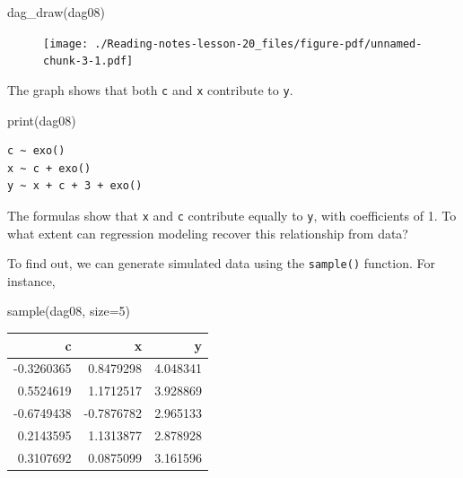 \documentclass[
  letterpaper,
  DIV=11,
  numbers=noendperiod,
  oneside]{scrreprt}
\newenvironment{Shaded}{\begin{snugshade}}{\end{snugshade}}
\newcommand{\AttributeTok}[1]{\textcolor[rgb]{0.40,0.45,0.13}{#1}}
\newcommand{\DecValTok}[1]{\textcolor[rgb]{0.68,0.00,0.00}{#1}}
\newcommand{\FunctionTok}[1]{\textcolor[rgb]{0.28,0.35,0.67}{#1}}
\newcommand{\NormalTok}[1]{\textcolor[rgb]{0.00,0.23,0.31}{#1}}
\begin{document}
\begin{Shaded}
\begin{Highlighting}[]
\FunctionTok{dag\_draw}\NormalTok{(dag08)}
\end{Highlighting}
\end{Shaded}

\begin{figure}[H]

{\centering \texttt{[image: ./Reading-notes-lesson-20\_files/figure-pdf/unnamed-chunk-3-1.pdf]}

}

\end{figure}

The graph shows that both \texttt{c} and \texttt{x} contribute to
\texttt{y}.

\begin{Shaded}
\begin{Highlighting}[]
\FunctionTok{print}\NormalTok{(dag08)}
\end{Highlighting}
\end{Shaded}

\begin{verbatim}
c ~ exo()
x ~ c + exo()
y ~ x + c + 3 + exo()
\end{verbatim}

The formulas show that \texttt{x} and \texttt{c} contribute equally to
\texttt{y}, with coefficients of 1. To what extent can regression
modeling recover this relationship from data?

To find out, we can generate simulated data using the \texttt{sample()}
function. For instance,

\begin{Shaded}
\begin{Highlighting}[]
\FunctionTok{sample}\NormalTok{(dag08, }\AttributeTok{size=}\DecValTok{5}\NormalTok{)}
\end{Highlighting}
\end{Shaded}

\ttfamily 
\begin{tabular}{rrr}
\toprule
c & x & y\\
\midrule
-0.3260365 & 0.8479298 & 4.048341\\
0.5524619 & 1.1712517 & 3.928869\\
-0.6749438 & -0.7876782 & 2.965133\\
0.2143595 & 1.1313877 & 2.878928\\
0.3107692 & 0.0875099 & 3.161596\\
\bottomrule
\end{tabular} \normalfont
\bigskip
\end{document}
